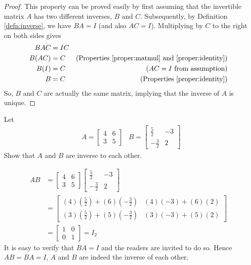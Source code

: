 \begin{proof}
This property can be proved easily by first assuming that the invertible matrix $A$ has two different inverses, $B$ and $C$. Subsequently, by Definition \ref{defn:inverse}, we have $BA = I$ (and also $AC = I$). Multiplying by $C$ to the right on both sides gives
\begin{align*}
BAC &= IC \\
B(AC) &= C & \text{(Properties \ref{proper:matmul} and \ref{proper:identity})}\\
B(I) &= C & \text{($AC = I$ from assumption)} \\
B &= C & \text{(Properties \ref{proper:identity})}
\end{align*}
So, $B$ and $C$ are actually the same matrix, implying that the inverse of $A$ is unique.    
\end{proof}
\begin{exmp}
Let 
\begin{align*}
& A =
\begin{bmatrix}
4 & 6 \\
3 & 5
\end{bmatrix}
& B =
\begin{bmatrix}
\frac{5}{2} & -3 \\
-\frac{3}{2} & 2
\end{bmatrix}
\end{align*}
Show that $A$ and $B$ are inverse to each other.
\end{exmp}
\begin{solution}
\begin{align*}
AB &= 
\begin{bmatrix}
4 & 6 \\
3 & 5
\end{bmatrix}
\begin{bmatrix}
\frac{5}{2} & -3 \\
-\frac{3}{2} & 2
\end{bmatrix} \\
&= 
\begin{bmatrix}
(4)(\frac{5}{2})+(6)(-\frac{3}{2}) & (4)(-3)+(6)(2) \\
(3)(\frac{5}{2})+(5)(-\frac{3}{2}) & (3)(-3)+(5)(2)
\end{bmatrix} \\
&= 
\begin{bmatrix}
1 & 0 \\
0 & 1
\end{bmatrix} = I_2
\end{align*}
It is easy to verify that $BA = I$ and the readers are invited to do so. Hence $AB = BA = I$, $A$ and $B$ are indeed the inverse of each other.
\end{solution}

